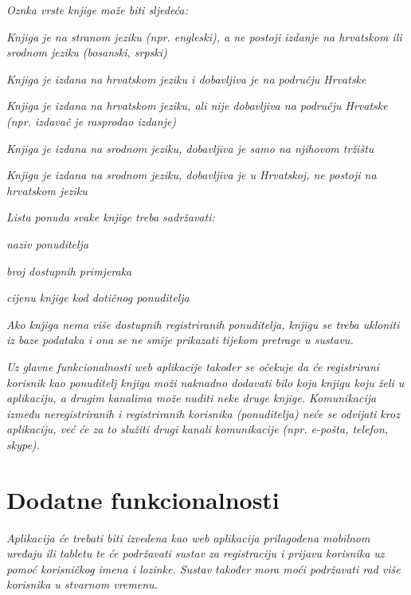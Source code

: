	\textit{Oznka vrste knjige može biti sljedeća:}
	
	\begin{packed_item}
		\item \textit {Knjiga je na stranom jeziku (npr. engleski), a ne postoji izdanje na hrvatskom ili srodnom jeziku (bosanski, srpski)}
		\item \textit {Knjiga je izdana na hrvatskom jeziku i dobavljiva je na području Hrvatske}
		\item \textit {Knjiga je izdana na hrvatskom jeziku, ali nije dobavljiva na području Hrvatske (npr. izdavač je rasprodao izdanje)}
		\item \textit {Knjiga je izdana na srodnom jeziku, dobavljiva je samo na njihovom tržištu}
		\item \textit {Knjiga je izdana na srodnom jeziku, dobavljiva je u Hrvatskoj, ne postoji na hrvatskom jeziku}
	\end{packed_item}
	
	\textit{Lista ponuda svake knjige treba sadržavati:}
	
	\begin{packed_item}
		\item \textit {naziv ponuditelja}
		\item \textit {broj dostupnih primjeraka}
		\item \textit {cijenu knjige kod dotičnog ponuditelja}
	\end{packed_item}
	
	\textit{Ako knjiga nema više dostupnih registriranih ponuditelja, knjigu se treba ukloniti iz baze podataka i ona se ne smije prikazati tijekom pretrage u sustavu.}
	
	\textit{Uz glavne funkcionalnosti web aplikacije također se očekuje da će registrirani korisnik kao ponuditelj knjiga moži naknadno dodavati bilo koju knjigu koju želi u aplikaciju, a drugim kanalima može nuditi neke druge knjige. Komunikacija između neregistriranih i registriranih korisnika (ponuditelja) neće se odvijati kroz aplikaciju, već će za to služiti drugi kanali komunikacije (npr. e-pošta, telefon, skype).}
	
	\section{Dodatne funkcionalnosti}
	
	\textit{Aplikacija će trebati biti izvedena kao web aplikacija prilagođena mobilnom uređaju ili tabletu te će podržavati sustav za registraciju i prijavu korisnika uz pomoć korisničkog imena i lozinke. Sustav također mora moći podržavati rad više korisnika u stvarnom vremenu.}
				

